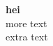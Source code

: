 \documentclass{article}
\begin{document}
    \textbf{hei}\\
    more text\\
    extra text
\end{document}
